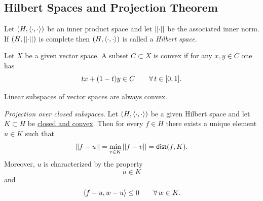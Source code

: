 \documentclass{article}
\begin{document}
\subsection{Hilbert Spaces and Projection Theorem}
\begin{definition}
	Let $\left(H,\langle \cdot,\cdot \rangle\right)$ be an inner product space and let $\left|\left|\cdot\right|\right|$ be the associated inner norm. If $(H,\left|\left|\cdot\right|\right|)$ is complete then $\left(H,\langle \cdot,\cdot \rangle\right)$ is called a \emph{Hilbert space}.
\end{definition}
\begin{definition}
	Let $X$ be a given vector space. A subset $C\subset X$ is convex if for any $x,y\in C$ one has
	\begin{equation*}
		tx+(1-t)y\in C\qquad\forall\, t\in[0,1].
	\end{equation*}
\end{definition}
Linear subspaces of vector spaces are always convex.
\begin{theorem}
	\emph{Projection over closed subspaces}. Let $(H,\langle \cdot,\cdot \rangle)$ be a given Hilbert space and let $K\subset H$ be \underline{closed and convex}. Then for every $f\in H$ there exists a unique element $u\in K$ such that
	\begin{equation*}
		\left|\left|f-u\right|\right|=\min_{v\in K}\left|\left|f-v\right|\right|=\mathsf{dist}({f,K}).
	\end{equation*}
	Moreover, $u$ is characterized by the property
	\begin{equation*}
		u\in K
	\end{equation*}
	and 
	\begin{equation*}
		\langle f-u,w-u\rangle\leq0\qquad\forall\, w\in K.
	\end{equation*}
\end{theorem}
\end{document}

